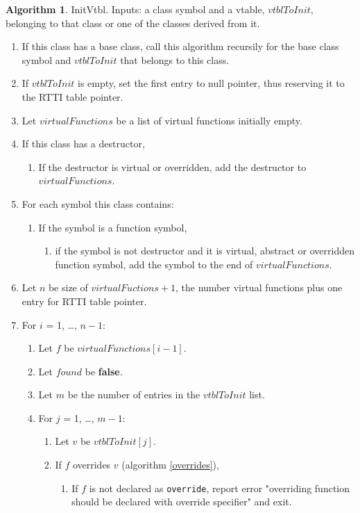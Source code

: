 \documentclass[a4paper,oneside,11pt]{book}
\theoremstyle{definition}
\newtheorem{algo}{Algorithm}[section]
\begin{document}
\begin{algo}\label{initvtbl} InitVtbl. Inputs: a class symbol and a vtable, $vtblToInit$, belonging to that class or one of the classes derived from it.
\begin{enumerate}
\item
If this class has a base class, call this algorithm recursily for the base class symbol and $vtblToInit$ that belongs to this class.
\item
If $vtblToInit$ is empty, set the first entry to null pointer, thus reserving it to the RTTI table pointer.
\item
Let $virtualFunctions$ be a list of virtual functions initially empty.
\item
If this class has a destructor,
\begin{enumerate}
\item
If the destructor is virtual or overridden, add the destructor to $virtualFunctions$.
\end{enumerate}
\item
For each symbol this class contains:
\begin{enumerate}
\item
If the symbol is a function symbol,
\begin{enumerate}
\item
if the symbol is not destructor and it is virtual, abstract or overridden function symbol, add the symbol to the end of $virtualFunctions$.
\end{enumerate}
\end{enumerate}
\item
Let $n$ be size of $virtualFuctions + 1$, the number virtual functions plus one entry for RTTI table pointer.
\item
For $i$ = 1, \ldots, $n - 1$:
\begin{enumerate}
\item
Let $f$ be $virtualFunctions[i - 1]$.
\item
Let $found$ be \textbf{false}.
\item
Let $m$ be the number of entries in the $vtblToInit$ list.
\item
For $j$ = 1, \ldots, $m - 1$:
\begin{enumerate}
\item
Let $v$ be $vtblToInit[j]$.
\item
If $f$ overrides $v$ (algorithm \ref{overrides}),
\begin{enumerate}
\item
If $f$ is not declared as \verb|override|, report error "overriding function should be declared with override specifier" and exit.

\end{enumerate}
\end{enumerate}
\end{enumerate}
\end{enumerate}
\end{algo}
\end{document}
